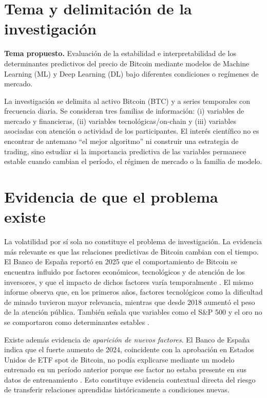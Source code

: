 \documentclass[11pt,letterpaper]{article}
\begin{document}
\tableofcontents
\newpage

\section{Tema y delimitación de la investigación}

\textbf{Tema propuesto.} Evaluación de la estabilidad e interpretabilidad de los determinantes predictivos del precio de Bitcoin mediante modelos de Machine Learning (ML) y Deep Learning (DL) bajo diferentes condiciones o regímenes de mercado.

La investigación se delimita al activo Bitcoin (BTC) y a series temporales con frecuencia diaria. Se consideran tres familias de información: (i) variables de mercado y financieras, (ii) variables tecnológicas/on-chain y (iii) variables asociadas con atención o actividad de los participantes. El interés científico no es encontrar de antemano ``el mejor algoritmo'' ni construir una estrategia de trading, sino estudiar si la importancia predictiva de las variables permanece estable cuando cambian el período, el régimen de mercado o la familia de modelo.

\section{Evidencia de que el problema existe}

La volatilidad por sí sola no constituye el problema de investigación. La evidencia más relevante es que las relaciones predictivas de Bitcoin cambian con el tiempo. El Banco de España reportó en 2025 que el comportamiento de Bitcoin se encuentra influido por factores económicos, tecnológicos y de atención de los inversores, y que el impacto de dichos factores varía temporalmente \parencite{bde2025}. El mismo informe observa que, en los primeros años, factores tecnológicos como la dificultad de minado tuvieron mayor relevancia, mientras que desde 2018 aumentó el peso de la atención pública. También señala que variables como el S\&P 500 y el oro no se comportaron como determinantes estables \parencite{bde2025}.

Existe además evidencia de \emph{aparición de nuevos factores}. El Banco de España indica que el fuerte aumento de 2024, coincidente con la aprobación en Estados Unidos de ETF spot de Bitcoin, no podía explicarse mediante un modelo entrenado en un período anterior porque ese factor no estaba presente en sus datos de entrenamiento \parencite{bde2025}. Esto constituye evidencia contextual directa del riesgo de transferir relaciones aprendidas históricamente a condiciones nuevas.
\end{document}
